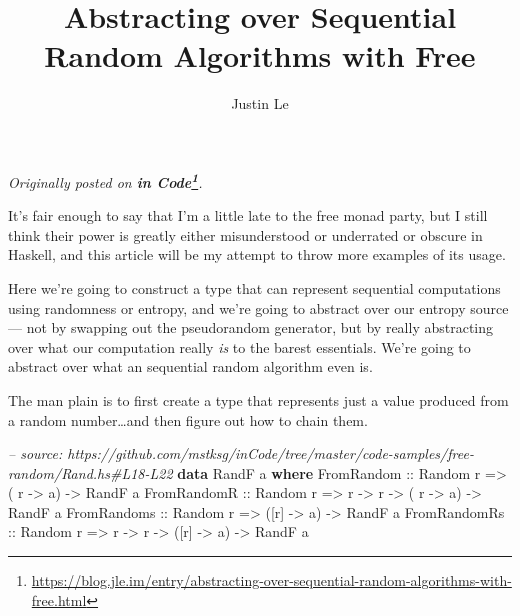 \documentclass[]{article}
\title{Abstracting over Sequential Random Algorithms with Free}
\author{Justin Le}
\newenvironment{Shaded}{}{}
\newcommand{\CommentTok}[1]{\textcolor[rgb]{0.38,0.63,0.69}{\textit{#1}}}
\newcommand{\DataTypeTok}[1]{\textcolor[rgb]{0.56,0.13,0.00}{#1}}
\newcommand{\KeywordTok}[1]{\textcolor[rgb]{0.00,0.44,0.13}{\textbf{#1}}}
\newcommand{\NormalTok}[1]{#1}
\newcommand{\OtherTok}[1]{\textcolor[rgb]{0.00,0.44,0.13}{#1}}
\renewcommand{\href}[2]{#2\footnote{\url{#1}}}
\begin{document}
\maketitle

\emph{Originally posted on
\textbf{\href{https://blog.jle.im/entry/abstracting-over-sequential-random-algorithms-with-free.html}{in
Code}}.}

It's fair enough to say that I'm a little late to the free monad party, but I
still think their power is greatly either misunderstood or underrated or obscure
in Haskell, and this article will be my attempt to throw more examples of its
usage.

Here we're going to construct a type that can represent sequential computations
using randomness or entropy, and we're going to abstract over our entropy source
--- not by swapping out the pseudorandom generator, but by really abstracting
over what our computation really \emph{is} to the barest essentials. We're going
to abstract over what an sequential random algorithm even is.

The man plain is to first create a type that represents just a value produced
from a random number\ldots{}and then figure out how to chain them.

\begin{Shaded}
\begin{Highlighting}[]
\CommentTok{-- source: https://github.com/mstksg/inCode/tree/master/code-samples/free-random/Rand.hs#L18-L22}
\KeywordTok{data} \DataTypeTok{RandF}\NormalTok{ a }\KeywordTok{where}
    \DataTypeTok{FromRandom}\OtherTok{   ::} \DataTypeTok{Random}\NormalTok{ r }\OtherTok{=>}\NormalTok{           ( r  }\OtherTok{->}\NormalTok{ a) }\OtherTok{->} \DataTypeTok{RandF}\NormalTok{ a}
    \DataTypeTok{FromRandomR}\OtherTok{  ::} \DataTypeTok{Random}\NormalTok{ r }\OtherTok{=>}\NormalTok{ r }\OtherTok{->}\NormalTok{ r }\OtherTok{->}\NormalTok{ ( r  }\OtherTok{->}\NormalTok{ a) }\OtherTok{->} \DataTypeTok{RandF}\NormalTok{ a}
    \DataTypeTok{FromRandoms}\OtherTok{  ::} \DataTypeTok{Random}\NormalTok{ r }\OtherTok{=>}\NormalTok{           ([r] }\OtherTok{->}\NormalTok{ a) }\OtherTok{->} \DataTypeTok{RandF}\NormalTok{ a}
    \DataTypeTok{FromRandomRs}\OtherTok{ ::} \DataTypeTok{Random}\NormalTok{ r }\OtherTok{=>}\NormalTok{ r }\OtherTok{->}\NormalTok{ r }\OtherTok{->}\NormalTok{ ([r] }\OtherTok{->}\NormalTok{ a) }\OtherTok{->} \DataTypeTok{RandF}\NormalTok{ a}
\end{Highlighting}
\end{Shaded}
\end{document}
